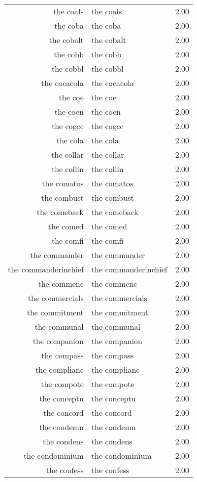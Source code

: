 \begin{table}[ht]
\begin{tabular}{rlr}
  the coals & the coals & 2.00 \\ 
  the coba & the coba & 2.00 \\ 
  the cobalt & the cobalt & 2.00 \\ 
  the cobb & the cobb & 2.00 \\ 
  the cobbl & the cobbl & 2.00 \\ 
  the cocacola & the cocacola & 2.00 \\ 
  the coe & the coe & 2.00 \\ 
  the coen & the coen & 2.00 \\ 
  the cogcc & the cogcc & 2.00 \\ 
  the cola & the cola & 2.00 \\ 
  the collar & the collar & 2.00 \\ 
  the collin & the collin & 2.00 \\ 
  the comatos & the comatos & 2.00 \\ 
  the combust & the combust & 2.00 \\ 
  the comeback & the comeback & 2.00 \\ 
  the comed & the comed & 2.00 \\ 
  the comfi & the comfi & 2.00 \\ 
  the commander & the commander & 2.00 \\ 
  the commanderinchief & the commanderinchief & 2.00 \\ 
  the commenc & the commenc & 2.00 \\ 
  the commercials & the commercials & 2.00 \\ 
  the commitment & the commitment & 2.00 \\ 
  the communal & the communal & 2.00 \\ 
  the companion & the companion & 2.00 \\ 
  the compass & the compass & 2.00 \\ 
  the complianc & the complianc & 2.00 \\ 
  the compote & the compote & 2.00 \\ 
  the conceptu & the conceptu & 2.00 \\ 
  the concord & the concord & 2.00 \\ 
  the condemn & the condemn & 2.00 \\ 
  the condens & the condens & 2.00 \\ 
  the condominium & the condominium & 2.00 \\ 
  the confess & the confess & 2.00 \\ 

\end{tabular}
\end{table}
